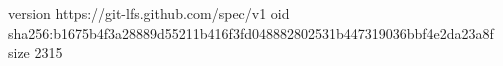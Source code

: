 version https://git-lfs.github.com/spec/v1
oid sha256:b1675b4f3a28889d55211b416f3fd048882802531b447319036bbf4e2da23a8f
size 2315
